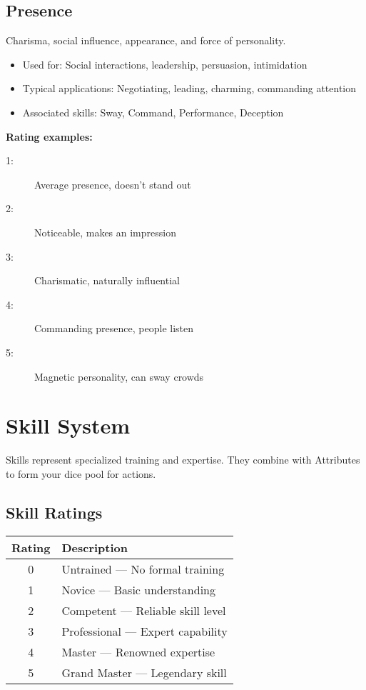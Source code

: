 \documentclass[11pt,twoside,openany]{book}
\begin{document}
\subsection*{Presence}

Charisma, social influence, appearance, and force of personality.
\begin{itemize}
\item Used for: Social interactions, leadership, persuasion, intimidation
\item Typical applications: Negotiating, leading, charming, commanding attention
\item Associated skills: Sway, Command, Performance, Deception
\end{itemize}

\textbf{Rating examples:}
\begin{description}
\item[1:] Average presence, doesn't stand out
\item[2:] Noticeable, makes an impression
\item[3:] Charismatic, naturally influential
\item[4:] Commanding presence, people listen
\item[5:] Magnetic personality, can sway crowds
\end{description}

\section*{Skill System} 

Skills represent specialized training and expertise. They combine with Attributes to form your dice pool for actions.

\subsection*{Skill Ratings}

\begin{center}
\begin{tabular}{|c|l|}
\hline
\textbf{Rating} & \textbf{Description} \\
\hline
0 & Untrained — No formal training \\
1 & Novice — Basic understanding \\
2 & Competent — Reliable skill level \\
3 & Professional — Expert capability \\
4 & Master — Renowned expertise \\
5 & Grand Master — Legendary skill \\
\hline
\end{tabular}
\end{center}
\end{document}
